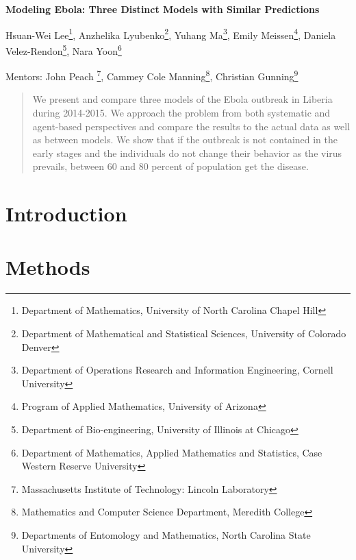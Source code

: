 \documentclass[10pt]{article}
\begin{document}
 

\centerline{\large \bf Modeling Ebola: Three Distinct Models with Similar Predictions}

\vspace{.1truein}

\def\thefootnote{\arabic{footnote}}
\begin{center}
  Hsuan-Wei Lee\footnote{Department of Mathematics, University of North Carolina Chapel Hill},
  Anzhelika Lyubenko\footnote{Department of Mathematical and Statistical Sciences, University of Colorado Denver},
  Yuhang Ma\footnote{Department of Operations Research and Information Engineering, Cornell University},
  Emily Meissen\footnote{Program of Applied Mathematics, University of Arizona},
  Daniela Velez-Rendon\footnote{Department of Bio-engineering, University of Illinois at Chicago},
    Nara Yoon\footnote{
Department of Mathematics, Applied Mathematics and Statistics, Case Western Reserve University}
\end{center}


\begin{center}
Mentors: John Peach \footnote{Massachusetts Institute of Technology: Lincoln Laboratory}, Cammey Cole Manning\footnote{Mathematics and Computer Science Department, Meredith College},
Christian Gunning\footnote{Departments of Entomology and Mathematics, North Carolina State University}
\end{center}

\begin{abstract}
\noindent We present and compare three models of the Ebola outbreak in Liberia during 2014-2015. We approach the problem from both systematic and agent-based perspectives and compare the results to the actual data as well as between models. We show that if the outbreak is not contained in the early stages and the individuals do not change their behavior as the virus prevails, between 60 and 80 percent of population get the disease. 
\end{abstract}

\tableofcontents

\section{Introduction}



\section{Methods}

\end{document}
